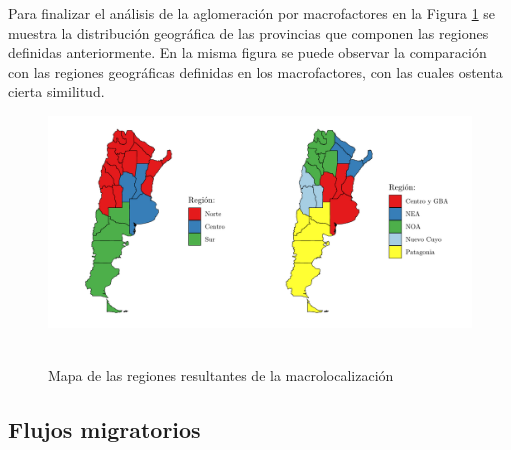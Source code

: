 \documentclass[12pt,a4paper]{article}
\begin{document}
\newpage
Para finalizar el análisis de la aglomeración por macrofactores en la Figura \ref{figure:mapa_reg} se muestra la distribución geográfica de las provincias que componen las regiones definidas anteriormente. En la misma figura se puede observar la comparación con las regiones geográficas definidas en los macrofactores, con las cuales ostenta cierta similitud.
\begin{figure}[ht!]
\begin{center}
\caption{\\Mapa de las regiones resultantes de la macrolocalización}
\includegraphics[scale=0.7]{./graficos/mapa_regiones.pdf}
\label{figure:mapa_reg}
\end{center}
\end{figure}
\newpage

\subsection{Flujos migratorios}
\end{document}
